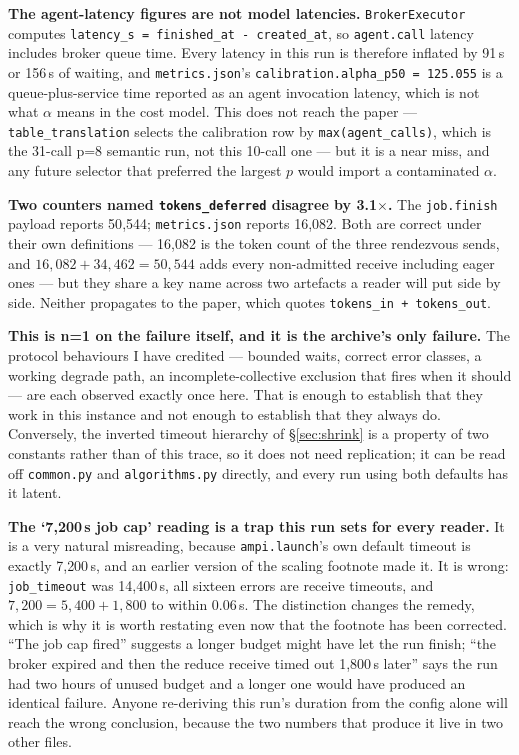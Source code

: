 \documentclass[11pt]{article}
\begin{document}
\textbf{The agent-latency figures are not model latencies.} \texttt{BrokerExecutor}
computes \texttt{latency\_s = finished\_at - created\_at}, so \texttt{agent.call} latency
includes broker queue time. Every latency in this run is therefore inflated by 91\,s or
156\,s of waiting, and \texttt{metrics.json}'s \texttt{calibration.alpha\_p50 = 125.055}
is a queue-plus-service time reported as an agent invocation latency, which is not what
$\alpha$ means in the cost model. This does not reach the paper --- \texttt{table\_translation}
selects the calibration row by \texttt{max(agent\_calls)}, which is the 31-call p=8
semantic run, not this 10-call one --- but it is a near miss, and any future selector that
preferred the largest $p$ would import a contaminated $\alpha$.

\textbf{Two counters named \texttt{tokens\_deferred} disagree by 3.1$\times$.} The
\texttt{job.finish} payload reports 50{,}544; \texttt{metrics.json} reports 16{,}082. Both
are correct under their own definitions --- 16{,}082 is the token count of the three
rendezvous sends, and $16{,}082 + 34{,}462 = 50{,}544$ adds every non-admitted receive
including eager ones --- but they share a key name across two artefacts a reader will put
side by side. Neither propagates to the paper, which quotes \texttt{tokens\_in +
tokens\_out}.

\textbf{This is n=1 on the failure itself, and it is the archive's only failure.} The
protocol behaviours I have credited --- bounded waits, correct error classes, a working
degrade path, an incomplete-collective exclusion that fires when it should --- are each
observed exactly once here. That is enough to establish that they work in this instance
and not enough to establish that they always do. Conversely, the inverted timeout
hierarchy of \S\ref{sec:shrink} is a property of two constants rather than of this trace,
so it does not need replication; it can be read off \texttt{common.py} and
\texttt{algorithms.py} directly, and every run using both defaults has it latent.

\textbf{The `7{,}200\,s job cap' reading is a trap this run sets for every reader.} It is a
very natural misreading, because \texttt{ampi.launch}'s own default timeout is exactly
7{,}200\,s, and an earlier version of the scaling footnote made it. It is wrong:
\texttt{job\_timeout} was 14{,}400\,s, all sixteen errors are receive timeouts, and
$7{,}200 = 5{,}400 + 1{,}800$ to within 0.06\,s. The distinction changes the remedy, which
is why it is worth restating even now that the footnote has been corrected. ``The job cap
fired'' suggests a longer budget might have let the run finish; ``the broker expired and
then the reduce receive timed out 1{,}800\,s later'' says the run had two hours of unused
budget and a longer one would have produced an identical failure. Anyone re-deriving this
run's duration from the config alone will reach the wrong conclusion, because the two
numbers that produce it live in two other files.
\end{document}
